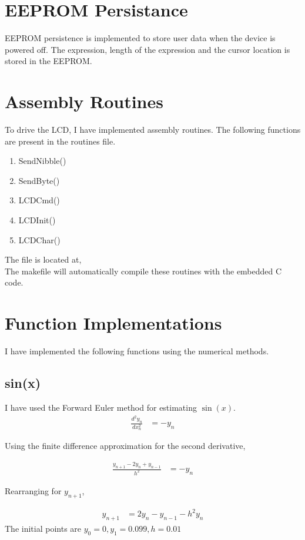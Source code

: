 \documentclass[journal]{IEEEtran}
\begin{document}
	\section{EEPROM Persistance}
	EEPROM persistence is implemented to store user data when the device is powered off. The expression, length of the expression and the cursor location is stored in the EEPROM.
	\section{Assembly Routines}
	To drive the LCD, I have implemented assembly routines. The following functions are present in the routines file.
	\begin{enumerate}
		\item SendNibble()
		\item SendByte()
		\item LCDCmd()
		\item LCDInit()
		\item LCDChar()
	\end{enumerate}
	The file is located at, \\
	 The makefile will automatically compile these routines with the embedded C code.
	
	\section{Function Implementations}
	I have implemented the following functions using the numerical methods.
\subsection{sin(x)}
I have used the Forward Euler method for estimating \(\sin(x)\). 
\begin{align}
	\frac{d^2 y_n}{d x_n^2} &= -y_n 
\end{align}

Using the finite difference approximation for the second derivative,

\begin{align}
	\frac{y_{n+1} - 2y_n + y_{n-1}}{h^2} &= -y_n
\end{align}

Rearranging for \( y_{n+1} \),

\begin{align}
	y_{n+1} &= 2y_n - y_{n-1} - h^2 y_n
\end{align}
The initial points are $y_0 = 0, y_1 = 0.099, h=  0.01$
\end{document}
